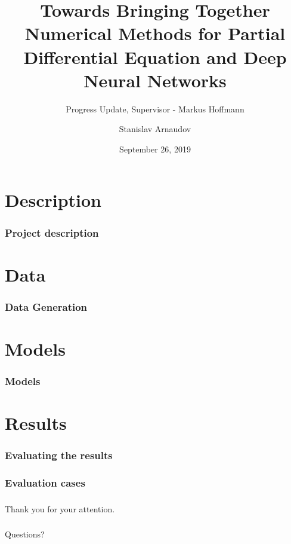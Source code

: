 \documentclass[18pt]{beamer}
\title[Progress Update]{Towards Bringing Together Numerical Methods for Partial Differential Equation and Deep Neural Networks}
\subtitle{Progress Update, Supervisor - Markus Hoffmann}
\author{Stanislav Arnaudov}
\institute{Chair for Computer Architecture and Parallel Processing}
\date{September 26, 2019}
\begin{document}
\begin{frame}
 \titlepage
\end{frame}



\begin{frame}
 \titlepage
\end{frame}


\section{Description}

\begin{frame}[t]
  \frametitle{Project description}  
\end{frame}

\section{Data}
\begin{frame}
  \frametitle{Data Generation}
\end{frame}

\section{Models}
\begin{frame}
  \frametitle{Models}  
\end{frame}

\section{Results}
\begin{frame}
  \frametitle{Evaluating the results}  
\end{frame}

\begin{frame}
  \frametitle{Evaluation cases}
\end{frame}

\begin{frame}
  \frametitle{}
  \begin{center}
    \huge{Thank you for your attention.}
  \end{center}
\end{frame}

\begin{frame}
  \frametitle{}
  \begin{center}
    \huge{Questions?}
  \end{center}
\end{frame}
\end{document}
